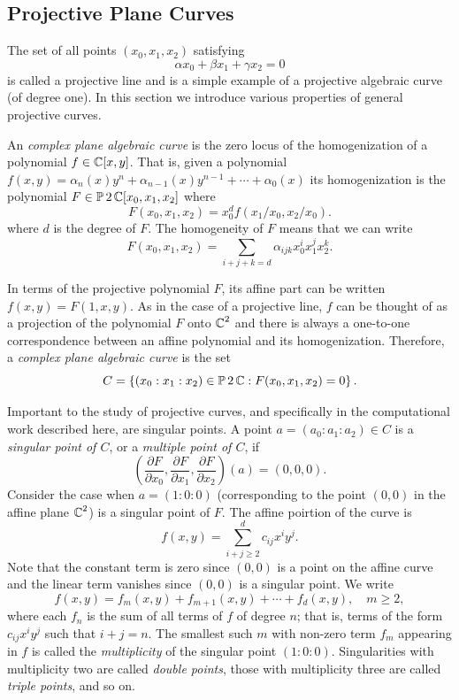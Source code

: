 \subsection{Projective Plane Curves}

The set of all points $(x_0, x_1, x_2)$ satisfying
\[
    \alpha x_0 + \beta x_1 + \gamma x_2 = 0
\]
is called a projective line and is a simple example of a projective
algebraic curve (of degree one). In this section we introduce various
properties of general projective curves.

An {\it complex plane algebraic curve} is the zero locus of the
homogenization of a polynomial $f \in \operatorname{\mathbb{C}}[x,y]$. That is, given a
polynomial $f(x,y) = \alpha_n(x) y^n + \alpha_{n-1}(x)y^{n-1} + \cdots +
\alpha_0(x)$ its homogenization is the polynomial $F \in
\operatorname{\mathbb{P}}{2}\operatorname{\mathbb{C}}[x_0,x_1,x_2]$ where
\[
    F(x_0,x_1,x_2) = x_0^d f(x_1/x_0,x_2/x_0).
\]
where $d$ is the degree of $F$. The homogeneity of $F$ means that we can
write
\[
    F(x_0,x_1,x_2) = \sum_{i+j+k=d} \alpha_{ijk} x_0^i x_1^j x_2^k.
\]

In terms of the projective polynomial $F$, its affine part can be
written $f(x,y) = F(1,x,y)$. As in the case of a projective line, $f$
can be thought of as a projection of the polynomial $F$ onto $\operatorname{\mathbb{C}}^2$ and
there is always a one-to-one correspondence between an affine polynomial
and its homogenization. Therefore, a {\it complex plane algebraic curve}
is the set
\[
  C = \left\{
  (x_0 : x_1 : x_2) \in \operatorname{\mathbb{P}}{2}\operatorname{\mathbb{C}} : F(x_0,x_1,x_2) = 0
  \right\}.
\]

Important to the study of projective curves, and specifically in the
computational work described here, are singular points. A point $a =
(a_0 : a_1 : a_2) \in C$ is a {\it singular point of $C$}, or a {\it
  multiple point of $C$}, if
\[
  \left(
    \frac{\partial F}{\partial x_0},
    \frac{\partial F}{\partial x_1},
    \frac{\partial F}{\partial x_2}
  \right) (a)
  = (0,0,0).
\]
Consider the case when $a = (1 : 0 : 0)$ (corresponding to the point
$(0,0)$ in the affine plane $\operatorname{\mathbb{C}}^2$) is a singular point of $F$. The
affine poirtion of the curve is
\[
f(x,y) = \sum_{i+j \geq 2}^d c_{ij} x^iy^j.
\]
Note that the constant term is zero since $(0, 0)$ is a point on the
affine curve and the linear term vanishes since $(0,0)$ is a singular
point. We write
\[
  f(x,y) = f_m(x,y) + f_{m+1}(x,y) + \cdots + f_d(x,y), \quad m \geq 2,
\]
where each $f_n$ is the sum of all terms of $f$ of degree $n$; that is,
terms of the form $c_{ij}x^iy^j$ such that $i+j=n$. The smallest such
$m$ with non-zero term $f_m$ appearing in $f$ is called the {\it
  multiplicity} of the singular point $(1 : 0 : 0)$. Singularities with
multiplicity two are called {\it double points}, those with multiplicity
three are called {\it triple points}, and so on.

